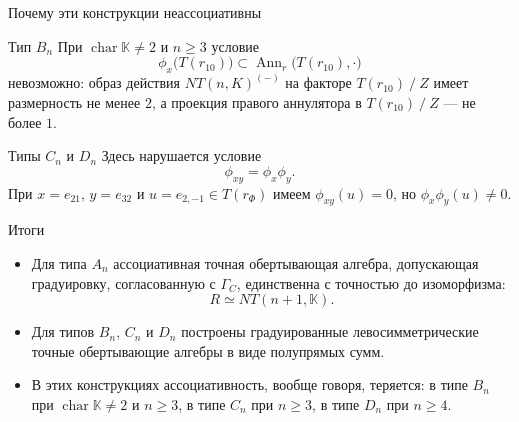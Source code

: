 \documentclass[12pt,aspectratio=169]{beamer}
\DeclareMathOperator{\Ann}{Ann}
\DeclareMathOperator{\Char}{char}
\newcommand{\K}{\mathbb{K}}
\newcommand{\quot}[2]{#1\mathbin{/}#2}
\begin{document}
\begin{frame}[t]{Почему эти конструкции неассоциативны}
    \small
    \begin{block}{Тип $B_n$}
        При $\Char\K\neq 2$ и $n\ge 3$ условие
        \[
            \phi_x\bigl(T(r_{10})\bigr)\subset \Ann_r\bigl(T(r_{10}),\cdot\bigr)
        \]
        невозможно: образ действия $NT(n,K)^{(-)}$ на факторе $\quot{T(r_{10})}{Z}$
        имеет размерность не менее $2$, а проекция правого аннулятора в
        $\quot{T(r_{10})}{Z}$ --- не более $1$.
    \end{block}

    \begin{block}{Типы $C_n$ и $D_n$}
        Здесь нарушается условие \[\phi_{xy}=\phi_x\phi_y.\] При $x=e_{21}$, $y=e_{32}$ и $u=e_{2,-1}\in T(r_\Phi)$ имеем $\phi_{xy}(u)=0$,
        но $\phi_x\phi_y(u)\ne 0$.
    \end{block}
\end{frame}

\begin{frame}[t]{Итоги}
    \begin{itemize}
        \item Для типа $A_n$ ассоциативная точная обертывающая алгебра, допускающая
              градуировку, согласованную с $\Gamma_C$, единственна с точностью до
              изоморфизма:
              \[
                  R\simeq NT(n+1,\K).
              \]
        \item Для типов $B_n$, $C_n$ и $D_n$ построены градуированные левосимметрические
              точные обертывающие алгебры в виде полупрямых сумм.
        \item В этих конструкциях ассоциативность, вообще говоря, теряется: в типе $B_n$ при
              $\Char\K\neq 2$ и $n \geq 3$, в типе $C_n$ при $n\ge 3$, в типе $D_n$ при $n\ge
              4$.
    \end{itemize}
\end{frame}
\end{document}
